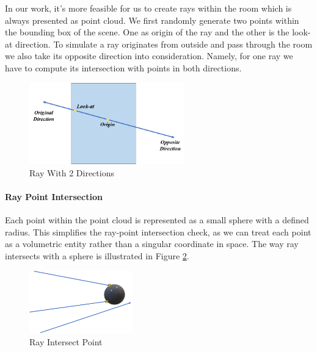 \documentclass[11pt, a4paper,oneside,chapterprefix=false]{scrbook}
\begin{document}
\vspace{10pt}

In our work, it's more feasible for us to create rays within the room which is always presented as point cloud. We first randomly generate two points within the bounding box of the scene. One as origin of the ray and the other is the look-at direction. To simulate a ray originates from outside and pass through the room we also take its opposite direction into consideration. Namely, for one ray we have to compute its intersection with points in both directions. 

\begin{figure}[H]
    \centering
    \includegraphics*[width=0.6\textwidth]{figures/ray with two directions.png}
    \caption{Ray With 2 Directions}
    \label{fig:ray with 2 directions}
\end{figure}

\paragraph{Ray Point Intersection} \label{ray point intersection}

Each point within the point cloud is represented as a small sphere with a defined radius. This simplifies the ray-point intersection check, as we can treat each point as a volumetric entity rather than a singular coordinate in space. The way ray intersects with a sphere is illustrated in Figure \ref{fig:ray intersect point}. 

\begin{figure}[H]
    \centering
    \includegraphics*[width=0.4\textwidth]{figures/ray intersect point.png}
    \caption{Ray Intersect Point}
    \label{fig:ray intersect point}
\end{figure}
\end{document}
